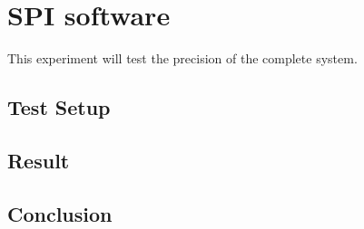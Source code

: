 
\section{SPI software}\label{sec:armspitest}

This experiment will test the precision of the complete system. 


\subsection{Test Setup}



\subsection{Result}


\subsection{Conclusion}

